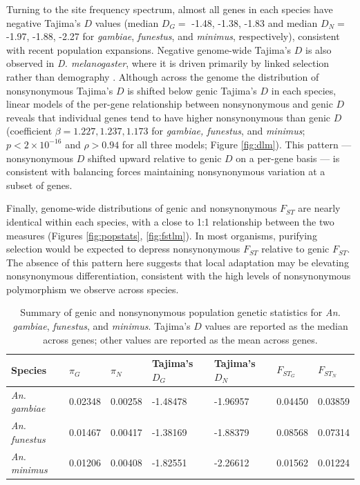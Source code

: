 Turning to the site frequency spectrum,
almost all genes in each species have negative Tajima's $D$ values
(median $D_G =$ -1.48, -1.38, -1.83
and median $D_{N} =$ -1.97, -1.88, -2.27
for \textit{gambiae}, \textit{funestus}, and \textit{minimus}, respectively),
consistent with recent population expansions.
Negative genome-wide Tajima's $D$ is also observed in \textit{D. melanogaster},
where it is driven primarily by linked selection
rather than demography \citep{drosophila}.
Although across the genome the distribution of nonsynonymous Tajima's $D$
is shifted below genic Tajima's $D$ in each species,
linear models of the per-gene relationship between nonsynonymous and genic $D$
reveals that individual genes tend to have higher nonsynonymous than genic $D$
(coefficient $\beta = 1.227, 1.237, 1.173$ for \textit{gambiae, funestus}, and \textit{minimus};
$p < 2\times10^{-16}$ and $\rho > 0.94$ for all three models;
Figure \ref{fig:dlm}).
This pattern --- nonsynonymous $D$ shifted upward relative to genic $D$
on a per-gene basis --- is consistent with balancing forces
maintaining nonsynonymous variation at a subset of genes.

Finally, genome-wide distributions of genic and nonsynonymous $F_{ST}$ are nearly identical
within each species, with a close to 1:1 relationship between the two measures
(Figures \ref{fig:popstats}, \ref{fig:fstlm}).
In most organisms, purifying selection would be expected to depress nonsynonymous $F_{ST}$
relative to genic $F_{ST}$.
The absence of this pattern here suggests that local adaptation
may be elevating nonsynonymous differentiation,
consistent with the high levels of nonsynonymous polymorphism
we observe across species.

\begin{table}[htp]
\centering
\begin{tabular}{@{}lllllll@{}}
\toprule
\textbf{Species}      & \textbf{$\pi_{G}$} & \textbf{$\pi_N$} & \textbf{Tajima's $D_G$} & \textbf{Tajima's $D_N$} & \textbf{$F_{ST_G}$} & \textbf{$F_{ST_{N}}$} \\ \midrule
\textit{An. gambiae}  & 0.02348            & 0.00258             & -1.48478                & -1.96957                   & 0.04450             & 0.03859                \\
\textit{An. funestus} & 0.01467            & 0.00417             & -1.38169                & -1.88379                   & 0.08568             & 0.07314                \\
\textit{An. minimus}  & 0.01206            & 0.00408             & -1.82551                & -2.26612                   & 0.01562             & 0.01224                \\ \bottomrule
\end{tabular}
\caption{Summary of genic and nonsynonymous population genetic statistics for 
\textit{An. gambiae}, \textit{funestus}, and \textit{minimus}. Tajima's $D$ values are reported as the median across genes; other 
values are reported as the mean across genes.}
\label{table:statstable}
\end{table}


